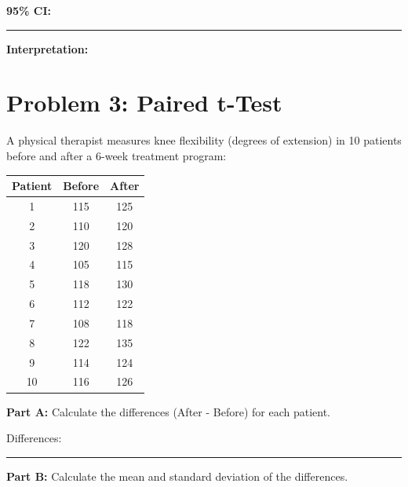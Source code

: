 \documentclass[11pt]{article}
\begin{document}
\vspace{0.3cm}

\textbf{95\% CI:} \rule{4cm}{0.4pt}

\vspace{0.3cm}

\textbf{Interpretation:}

\vspace{2.5cm}

\newpage

\section{Problem 3: Paired t-Test}

A physical therapist measures knee flexibility (degrees of extension) in 10 patients before and after a 6-week treatment program:

\vspace{0.3cm}

\begin{center}
\begin{tabular}{ccc}
\toprule
Patient & Before & After \\
\midrule
1 & 115 & 125 \\
2 & 110 & 120 \\
3 & 120 & 128 \\
4 & 105 & 115 \\
5 & 118 & 130 \\
6 & 112 & 122 \\
7 & 108 & 118 \\
8 & 122 & 135 \\
9 & 114 & 124 \\
10 & 116 & 126 \\
\bottomrule
\end{tabular}
\end{center}

\vspace{6pt}

\textbf{Part A:} Calculate the differences (After - Before) for each patient.

\vspace{0.3cm}

Differences: \rule{10cm}{0.4pt}

\vspace{0.5cm}

\textbf{Part B:} Calculate the mean and standard deviation of the differences.

\vspace{0.3cm}
\end{document}
